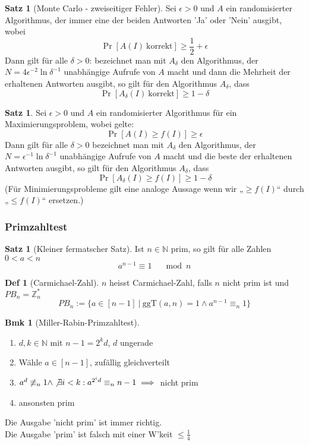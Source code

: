 \documentclass[a4paper, 10pt]{article}
\theoremstyle{definition}
\newtheorem*{definition*}{Def}
\newtheorem{theorem}[definition]{Satz}
\newtheorem*{note}{Bmk}
\theoremstyle{named}
\newcommand{\N}{\mathbb{N}}
\newcommand{\Z}{\mathbb{Z}}
\begin{document}
\begin{theorem}[Monte Carlo - zweiseitiger Fehler]
    Sei $\epsilon > 0$ und $A$ ein randomisierter Algorithmus, der immer eine der beiden Antworten 'Ja' oder 'Nein' ausgibt, wobei
    $$\Pr[A(I) \ \text{korrekt}] \geq \frac{1}{2} + \epsilon$$
    Dann gilt für alle $\delta > 0$: bezeichnet man mit $A_\delta$ den Algorithmus, der $N = 4 \epsilon^{-2}\ln \delta^{-1}$ unabhängige Aufrufe von $A$ macht und dann die Mehrheit der erhaltenen Antworten ausgibt, so gilt für den Algorithmus $A_\delta$, dass
    $$\Pr[A_\delta(I) \ \text{korrekt}] \geq 1 - \delta$$
\end{theorem}

\begin{theorem}
    Sei $\epsilon > 0$ und $A$ ein randomisierter Algorithmus für ein Maximierungsproblem, wobei gelte: $$\Pr[A(I) \geq f(I)] \geq \epsilon$$ Dann gilt für alle $\delta > 0$ bezeichnet man mit $A_\delta$ den Algorithmus, der $N = \epsilon^{-1}\ln \delta^{-1}$ unabhängige Aufrufe von $A$ macht und die beste der erhaltenen Antworten ausgibt, so gilt für den Algorithmus $A_\delta$, dass $$\Pr[A_\delta(I) \geq f(I)] \geq 1 -\delta$$ (Für Minimierungsprobleme gilt eine analoge Aussage wenn wir „$\geq f(I)$“ durch „$\leq f(I)$“ ersetzen.)
\end{theorem}

\setcounter{subsubsection}{2}
\subsubsection{Primzahltest}
\begin{theorem}[Kleiner fermatscher Satz]
    Ist $n \in \N$ prim, so gilt für alle Zahlen $0 < a < n$
    $$a^{n - 1} \equiv 1 \quad \mod n$$
\end{theorem}

\begin{definition*}[Carmichael-Zahl]
    $n$ heisst Carmichael-Zahl, falls $n$ nicht prim ist und $PB_n = \Z_n^*$
    $$PB_n := \{ a \in [n - 1] \ | \ \text{ggT}(a, n) = 1 \land a^{n-1} \equiv_n 1 \}$$
\end{definition*}

\begin{note}[Miller-Rabin-Primzahltest]
    $\,$
    \begin{enumerate}
        \item $d, k \in \N$ mit $n-1 = 2^kd$, $d$ ungerade
        \item Wähle $a \in [n-1]$, zufällig gleichverteilt
        \item $a^d \not\equiv_n 1 \land \not\exists i < k: a^{2^i d} \equiv_n n-1 \implies$ nicht prim
        \item ansonsten prim
    \end{enumerate}
    Die Ausgabe 'nicht prim' ist immer richtig. \\
    Die Ausgabe 'prim' ist falsch mit einer W'keit $\leq \frac{1}{4}$
\end{note}
\end{document}
